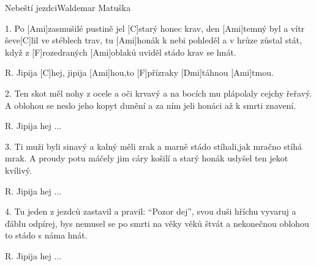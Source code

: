 \begin{song}{Nebeští jezdci}{Waldemar Matuška}

\begin{xverse}{1. }
Po [Ami]zasmušilé pustině jel [C]starý honec krav,
den [Ami]temný byl a vítr ševe[C]lil ve stéblech trav,
tu [Ami]honák k nebi pohleděl a v hrůze zůstal stát,
když z [F]rozedraných [Ami]oblaků uviděl stádo krav se hnát.
\end{xverse}

\begin{xverse}{R. }
Jipija [C]hej, jipija [Ami]hou,to [F]přízraky [Dmi]táhnou [Ami]tmou.
\end{xverse}

\begin{xverse}{2. }
Ten skot měl nohy z ocele a oči krvavý
a na bocích mu plápolaly cejchy řeřavý.
A oblohou se neslo jeho kopyt dunění
a za ním jeli honáci až k smrti znavení.
\end{xverse}

\begin{xverse}{R. }
Jipija hej ...
\end{xverse}


\begin{xverse}{3. }
Ti muži byli sinavý a kalný měli zrak
a marně stádo stíhali,jak mračno stíhá mrak.
A proudy potu máčely jim cáry košilí
a starý honák uslyšel ten jekot kvílivý.
\end{xverse}

\begin{xverse}{R. }
Jipija hej ...
\end{xverse}

\begin{xverse}{4. }
Tu jeden z jezdců zastavil a pravil: ``Pozor dej'',
svou duši hříchu vyvaruj a ďáblu odpírej,
bys nemusel se po smrti na věky věků štvát
a nekonečnou oblohou to stádo s náma hnát.
\end{xverse}

\begin{xverse}{R. }
Jipija hej ...
\end{xverse}

\end{song}

